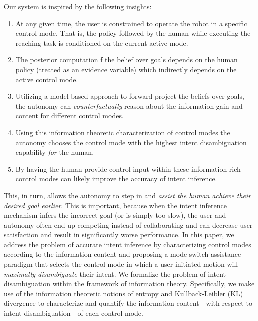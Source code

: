 \documentclass[conference]{IEEEtran}
\begin{document}
Our system is inspired by the following insights:
\begin{enumerate}
	\item At any given time, the user is constrained to operate the robot in a specific control mode. That is, the policy followed by the human while executing the reaching task is conditioned on the current active mode. 
	\item The posterior computation f the belief over goals depends on the human policy (treated as an evidence variable) which indirectly depends on the active control mode. 
	\item Utilizing a model-based approach to forward project the beliefs over goals, the autonomy can \textit{counterfactually } reason about the information gain and content for different control modes. 
	\item Using this information theoretic characterization of control modes the autonomy chooses the control mode with the highest intent disambiguation capability \textit{for} the human.
	\item By having the human provide control input within these information-rich control modes can likely improve the accuracy of intent inference. 
\end{enumerate}
This, in turn, allows the autonomy to step in and \textit{assist the human achieve their desired goal earlier}.  This is important, because when the intent inference mechanism infers the incorrect goal (or is simply too slow), the user and autonomy often end up competing instead of collaborating and can decrease user satisfaction and result in significantly worse performance. 
In this paper, we address the problem of accurate intent inference by characterizing control modes according to the information content and proposing a mode switch assistance paradigm that selects the control mode in which a user-initiated motion will \textit{maximally disambiguate} their intent. We formalize the problem of intent disambiguation within the framework of information theory. Specifically, we make use of the information theoretic notions of entropy and Kullback-Leibler (KL) divergence to characterize and quantify the information content---with respect to intent disambiguation---of each control mode. 
\end{document}
